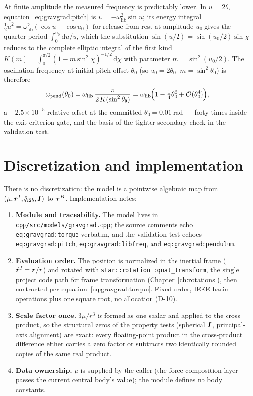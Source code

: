 At finite amplitude the measured frequency is predictably lower. In
$u = 2\theta$, equation~\eqref{eq:gravgrad:pitch} is $\ddot{u} =
-\omega_{\mathrm{lib}}^2 \sin u$; its energy integral $\tfrac{1}{2}
\dot{u}^2 = \omega_{\mathrm{lib}}^2 (\cos u - \cos u_0)$ for release from
rest at amplitude $u_0$ gives the quarter period $\int_0^{u_0}
\mathrm{d}u / \dot{u}$, which the substitution $\sin(u/2) =
\sin(u_0/2)\sin\chi$ reduces to the complete elliptic integral of the
first kind $K(m) = \int_0^{\pi/2} (1 - m \sin^2\chi)^{-1/2}\,
\mathrm{d}\chi$ with parameter $m = \sin^2(u_0/2)$. The oscillation
frequency at initial pitch offset $\theta_0$ (so $u_0 = 2\theta_0$, $m =
\sin^2\theta_0$) is therefore
\begin{equation}
  \omega_{\mathrm{pend}}(\theta_0)
    = \omega_{\mathrm{lib}}\, \frac{\pi}{2\,K(\sin^2\theta_0)}
    = \omega_{\mathrm{lib}}
      \Bigl(1 - \tfrac{1}{4}\theta_0^{2}
      + \mathcal{O}(\theta_0^{4})\Bigr) ,
  \label{eq:gravgrad:pendulum}
\end{equation}
a $-2.5 \times 10^{-5}$ relative offset at the committed $\theta_0 =
\qty{0.01}{\radian}$ --- forty times inside the exit-criterion gate, and
the basis of the tighter secondary check in the validation test.

\section{Discretization and implementation}
\label{sec:gravgrad:implementation}

There is no discretization: the model is a pointwise algebraic map from
$(\mu, \bm{r}^{I}, \bar{q}_{i2b}, \bm{I})$ to $\bm{\tau}^{B}$.
Implementation notes:
\begin{enumerate}
  \item \textbf{Module and traceability.} The model lives in
    \texttt{cpp/src/models/gravgrad.cpp}; the source comments echo
    \texttt{eq:gravgrad:torque} verbatim, and the validation test echoes
    \texttt{eq:gravgrad:pitch}, \texttt{eq:gravgrad:libfreq}, and
    \texttt{eq:gravgrad:pendulum}.
  \item \textbf{Evaluation order.} The position is normalized in the
    inertial frame ($\hat{\bm{r}}^{I} = \bm{r}/r$) and rotated with
    \texttt{star::rotation::quat\_transform}, the single project code path
    for frame transformation (Chapter~\ref{ch:rotations}), then contracted
    per equation~\eqref{eq:gravgrad:torque}. Fixed order, IEEE basic
    operations plus one square root, no allocation (D-10).
  \item \textbf{Scale factor once.} $3\mu/r^{3}$ is formed as one scalar
    and applied to the cross product, so the structural zeros of the
    property tests (spherical $\bm{I}$, principal-axis alignment) are
    exact: every floating-point product in the cross-product difference
    either carries a zero factor or subtracts two identically rounded
    copies of the same real product.
  \item \textbf{Data ownership.} $\mu$ is supplied by the caller (the
    force-composition layer passes the current central body's value); the
    module defines no body constants.
\end{enumerate}


